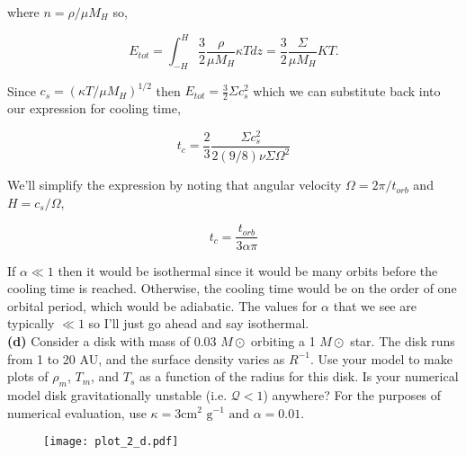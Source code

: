 \documentclass[12pt]{article}
\begin{document}
\noindent where $ n = \rho/\mu M_H$ so, 

\begin{equation}
E_{tot} = \int_{-H}^{H}  \frac{3}{2} \frac{\rho}{\mu M_H} \kappa T dz = \frac{3}{2} \frac{\Sigma}{\mu M_H} K T.
\end{equation}

\noindent Since $c_s = \left( \kappa T/ \mu M_H \right)^{1/2}$ then $E_{tot} = \frac{3}{2} \Sigma c_s^2$ which we can substitute back into our expression for cooling time,

\begin{equation}
t_c = \frac{2}{3} \frac{\Sigma c_s^2}{2 \left(9/8 \right) \nu \Sigma \Omega^2}
\end{equation}

\noindent We'll simplify the expression by noting that angular velocity $\Omega = 2\pi/t_{orb}$ and $H = c_s / \Omega$, 

\begin{equation}
t_c = \frac{t_{orb}}{3 \alpha \pi }
\end{equation}

\noindent If $\alpha \ll 1$ then it would be isothermal since it would be many orbits before the cooling time is reached. Otherwise, the cooling time would be on the order of one orbital period, which would be adiabatic. The values for $\alpha$ that we see are typically $\ll 1$ so I'll just go ahead and say isothermal. \\

\noindent \textbf{(d)} Consider a disk with mass of 0.03 $M\odot$ orbiting a 1 $M\odot$ star. The disk runs from 1 to 20 AU, and the surface density varies as $R^{-1}$. Use your model to make plots of $\rho_m$, $T_m$, and $T_s$ as a function of the radius for this disk. Is your numerical model disk gravitationally unstable (i.e. $\mathcal{Q} < 1$) anywhere? For the purposes of numerical evaluation, use $\kappa = 3 \text{cm}^2 \text{ g}^{-1} \text{ and } \alpha = 0.01$. \\


\begin{figure}[H]
\texttt{[image: plot\_2\_d.pdf]}
\end{figure}
\end{document}
